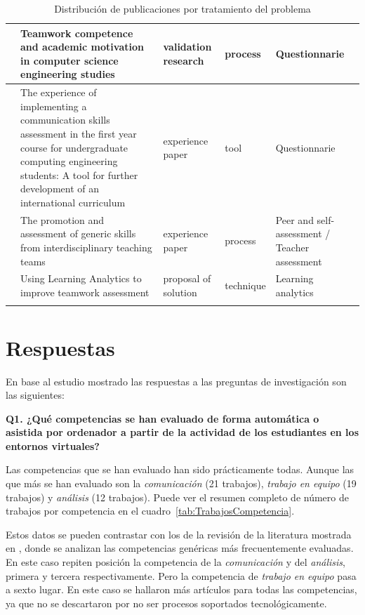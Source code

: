 \begin{landscape}
\begin{center}
\begin{longtable}{| m{2.5cm} | m{9cm} | m{4cm} | m{2.5cm} | m{3.5cm} |}
    \hline
    \cite{martinez2014teamwork} & Teamwork competence and academic motivation in computer science engineering studies & validation research & process & Questionnarie \\
    \hline
    \cite{fernandez2011experience} & The experience of implementing a communication skills assessment in the first year course for undergraduate computing engineering students: A tool for further development of an international curriculum & experience paper & tool & Questionnarie \\
    \hline
    \cite{carreras2013promotion} & The promotion and assessment of generic skills from interdisciplinary teaching teams & experience paper & process & Peer and self-assessment / Teacher assessment \\
    \hline
    \cite{fidalgo:2015} & Using Learning Analytics to improve teamwork assessment & proposal of solution & technique & Learning analytics \\
    \hline
\caption{Distribución de publicaciones por tratamiento del problema}
\label{tab:ListadoTrabajos}
\end{longtable}
\end{center}
\end{landscape}

\pagestyle{fancy}
\section{Respuestas}

En base al estudio mostrado las respuestas a las preguntas de investigación son las siguientes:

\bigskip
\textbf{Q1. ¿Qué competencias se han evaluado de forma automática o asistida por ordenador a partir de la actividad de los estudiantes en los entornos virtuales?}

Las competencias que se han evaluado han sido prácticamente todas. Aunque las que más se han evaluado son la \emph{comunicación} (21 trabajos), \emph{trabajo en equipo} (19 trabajos) y \emph{análisis} (12 trabajos). Puede ver el resumen completo de número de trabajos por competencia en el cuadro~\ref{tab:TrabajosCompetencia}.

Estos datos se pueden contrastar con los de la revisión de la literatura mostrada en \cite{strijbos2015criteria}, donde se analizan las competencias genéricas más frecuentemente evaluadas. En este caso repiten posición la competencia de la \emph{comunicación} y del \emph{análisis}, primera y tercera respectivamente. Pero la competencia de \emph{trabajo en equipo} pasa a sexto lugar. En este caso se hallaron más artículos para todas las competencias, ya que no se descartaron por no ser procesos soportados tecnológicamente. 

